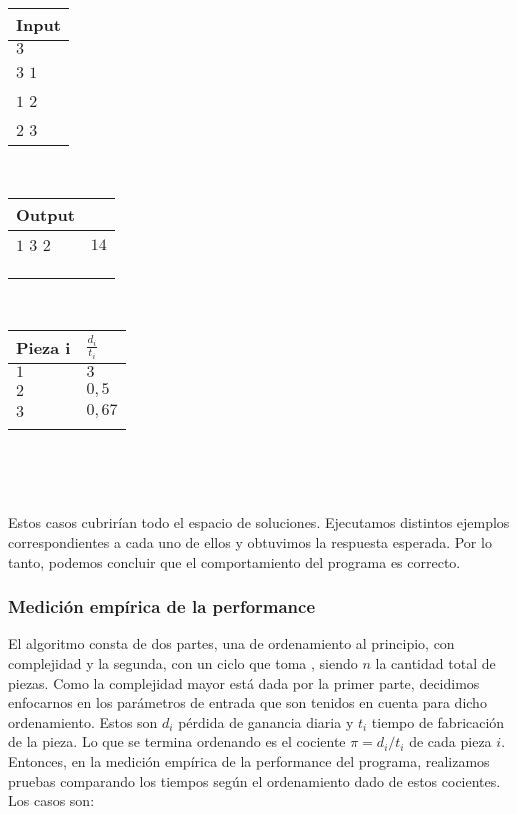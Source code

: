 \documentclass[11pt, a4paper, twoside]{article}
\begin{document}
\begin{enumerate}
\begin{itemize}
		\begin{minipage}{0.2\textwidth}
			\begin{tabular}{l}
				Input  \\
				\hline
				$3$   \\
				$3$ $1$ \\
				$1$ $2$ \\
				$2$ $3$ \\
			\end{tabular} \\ 
		\end{minipage}
		\begin{minipage}{0.3\textwidth}
			\begin{tabular}{ll}
				Output  \\
				\hline
				$1$ $3$ $2$ & $14$ \\
				\\
				\\
				\\
			\end{tabular} \\ 
		\end{minipage}  
        	\begin{minipage}{0.2\textwidth}
			\begin{tabular}{l|l}
				Pieza i & $\frac{d_i}{t_i}$  \\
				\hline
				$1$     & $3$ \\
				$2$     & $0,5$ \\
				$3$     & $0,67$ \\
				\\
			\end{tabular} \\ 
		\end{minipage}  \\		
		
	\end{itemize}
	
\end{enumerate}

Estos casos cubrirían todo el espacio de soluciones. Ejecutamos distintos ejemplos correspondientes a cada
uno de ellos y obtuvimos la respuesta esperada. Por lo tanto, podemos concluir que el comportamiento del programa 
es correcto. 

\subsubsection{Medición empírica de la performance}

El algoritmo consta de dos partes, una de ordenamiento al principio, con complejidad  y la segunda,
con un ciclo que toma , siendo $n$ la cantidad total de piezas. Como la complejidad mayor está dada por la
primer parte, decidimos enfocarnos en los parámetros de entrada que son tenidos en cuenta para dicho ordenamiento. 
Estos son $d_i$ pérdida de ganancia diaria y $t_i$ tiempo de fabricación de la pieza. Lo que se termina ordenando 
es el cociente $\pi=d_i/t_i$ de cada pieza $i$.\\
Entonces, en la medición empírica de la performance del programa, realizamos pruebas comparando los tiempos según el
ordenamiento dado de estos cocientes. Los casos son: 
\end{document}
